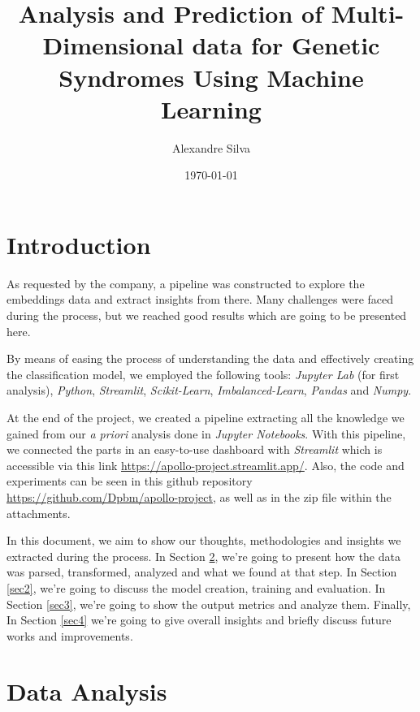 \documentclass{article}
\begin{document}
	
\title{Analysis and Prediction of Multi-Dimensional data for Genetic Syndromes Using Machine Learning}
\author{Alexandre Silva}
\date{\today}
	
\maketitle

\section{Introduction}

As requested by the company, a pipeline was constructed to explore the embeddings data and extract insights from there. Many challenges were faced during the process, but we reached good results which are going to be presented here.

By means of easing the process of understanding the data and effectively creating the classification model, we employed the following tools: \textit{Jupyter Lab} (for first analysis), \textit{Python}, \textit{Streamlit}, \textit{Scikit-Learn}, \textit{Imbalanced-Learn}, \textit{Pandas} and \textit{Numpy}.

At the end of the project, we created a pipeline extracting all the knowledge we gained from our \textit{a priori} analysis done in \textit{Jupyter Notebooks}. With this pipeline, we connected the parts in an easy-to-use dashboard with \textit{Streamlit} which is accessible via this link \href{https://apollo-project.streamlit.app/}{https://apollo-project.streamlit.app/}. Also, the code and experiments can be seen in this github repository \href{https://github.com/Dpbm/apollo-project}{https://github.com/Dpbm/apollo-project}, as well as in the zip file within the attachments.

In this document, we aim to show our thoughts, methodologies and insights we extracted during the process. In Section \ref{sec1}, we’re going to present how the data was parsed, transformed, analyzed and what we found at that step. In Section \ref{sec2}, we’re going to discuss the model creation, training and evaluation. In Section \ref{sec3}, we’re going to show the output metrics and analyze them. Finally, In Section \ref{sec4} we’re going to give overall insights and briefly discuss future works and improvements.

\section{Data Analysis} \label{sec1}
\end{document}
